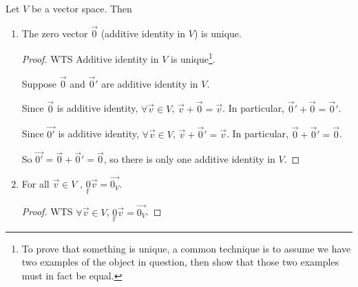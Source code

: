 \documentclass[11pt,fleqn]{book} %
\begin{document}
\setcounter{section}{1}
\setcounter{dummy}{5}
\begin{proposition}
    Let $V$ be a vector space. Then 
    
    \begin{enumerate}[label=\alph*)]
        \item The zero vector $\overrightarrow{0}$ (additive identity in $V$) is unique.
        \begin{proof}
            WTS Additive identity in $V$ is unique\footnote{To prove that something is unique, a common technique is to assume we have two examples of the object in question, then show that those two examples must in fact be equal. }.

            Suppose $\overrightarrow{0}$ and $\overrightarrow{0}'$ are additive identity in $V$. 
            
            Since $\overrightarrow{0}$ is additive identity, $\forall \overrightarrow{v} \in V$, $\overrightarrow{v} + \overrightarrow{0} = \overrightarrow{v}$. In particular, $\overrightarrow{0}' + \overrightarrow{0} = \overrightarrow{0}'$. 
            
            Since $\overrightarrow{0'}$ is additive identity, $\forall \overrightarrow{v} \in V$, $\overrightarrow{v} + \overrightarrow{0}' = \overrightarrow{v}$. In particular, $\overrightarrow{0} + \overrightarrow{0}' = \overrightarrow{0}$. 

            So $\overrightarrow{0'} = \overrightarrow{0} + \overrightarrow{0}' = \overrightarrow{0}$, so there is only one additive identity in $V$.
        \end{proof}

        \item For all $\overrightarrow{v} \in V$ , $\underset{\mathbb{F}}{0}\overrightarrow{v} = \overrightarrow{0_V}$.

        \begin{proof}
            WTS $\forall \overrightarrow{v} \in V$, $\underset{\mathbb{F}}{0}\overrightarrow{v} = \overrightarrow{0_V}$. 
            

\end{proof}
\end{enumerate}
\end{proposition}
\end{document}
